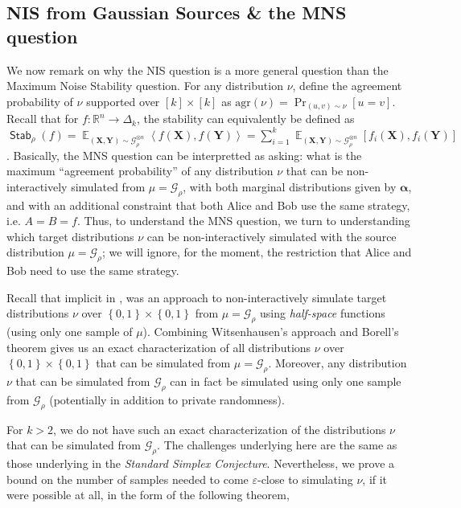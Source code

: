 \documentclass[11pt]{article}
\newcommand{\inbrace}[1]{\left \{ #1 \right \}}
\newcommand{\inangle}[1]{\left \langle #1 \right \rangle}
\newcommand{\set}[1]{\inbrace{#1}}
\DeclareMathOperator*{\Ex}{\mathbb{E}}
\DeclareMathOperator*{\Stab}{\mathsf{Stab}}
\newcommand{\bit}{\set{0,1}}
\newcommand{\eps}{\varepsilon}
\newcommand{\bbR}{{\mathbb R}}
\newcommand{\bX}{\mathbf{X}}
\newcommand{\bY}{\mathbf{Y}}
\newcommand{\balpha}{{\boldsymbol \alpha}}
\newcommand{\calG}{\mathcal{G}}
\begin{document}
\subsection{NIS from Gaussian Sources \& the MNS question}

We now remark on why the NIS question is a more general question than the Maximum Noise Stability question. For any distribution $\nu$, define the agreement probability of $\nu$ supported over $[k] \times [k]$ as $\mathrm{agr}(\nu) = \Pr_{(u,v) \sim \nu} [u = v]$. Recall that for $f : \bbR^n \to \Delta_k$, the stability can equivalently be defined as $\Stab_\rho(f) = \Ex_{(\bX, \bY) \sim \calG_\rho^{\otimes n}} \inangle{f(\bX), f(\bY)} = \sum_{i=1}^{k} \Ex_{(\bX, \bY) \sim \calG_\rho^{\otimes n}} [f_i(\bX), f_i(\bY)]$. Basically, the MNS question can be interpretted as asking: what is the maximum ``agreement probability'' of any distribution $\nu$ that can be non-interactively simulated from $\mu = \calG_\rho$, with both marginal distributions given by $\balpha$, and with an additional constraint that both Alice and Bob use the same strategy, i.e. $A = B = f$. Thus, to understand the MNS question, we turn to understanding which target distributions $\nu$ can be non-interactively simulated with the source distribution $\mu = \calG_{\rho}$; we will ignore, for the moment, the restriction that Alice and Bob need to use the same strategy.

Recall that implicit in \cite{witsenhausen1975sequences}, was an approach to non-interactively simulate target distributions $\nu$ over $\bit \times \bit$ from $\mu = \calG_{\rho}$ using {\em half-space} functions (using only one sample of $\mu$). Combining Witsenhausen's approach and Borell's theorem \cite{borell1985geometric} gives us an exact characterization of all distributions $\nu$ over $\bit \times \bit$ that can be simulated from $\mu = \calG_{\rho}$. Moreover, any distribution $\nu$ that can be simulated from $\calG_{\rho}$ can in fact be simulated using only one sample from $\calG_{\rho}$ (potentially in addition to private randomness).

For $k > 2$, we do not have such an exact characterization of the distributions $\nu$ that can be simulated from $\calG_{\rho}$. The challenges underlying here are the same as those underlying in the {\em Standard Simplex Conjecture}. Nevertheless, we prove a bound on the number of samples needed to come $\eps$-close to simulating $\nu$, if it were possible at all, in the form of the following theorem,
\end{document}

